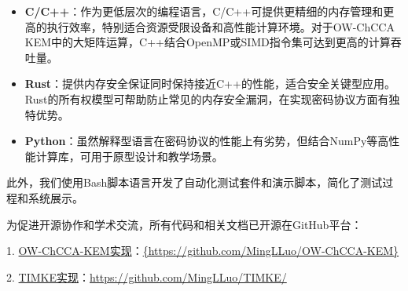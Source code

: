 \begin{itemize}
  \item \textbf{C/C++}：作为更低层次的编程语言，C/C++可提供更精细的内存管理和更高的执行效率，特别适合资源受限设备和高性能计算环境。对于OW-ChCCA KEM中的大矩阵运算，C++结合OpenMP或SIMD指令集可达到更高的计算吞吐量。
  
  \item \textbf{Rust}：提供内存安全保证同时保持接近C++的性能，适合安全关键型应用。Rust的所有权模型可帮助防止常见的内存安全漏洞，在实现密码协议方面有独特优势。
  
  \item \textbf{Python}：虽然解释型语言在密码协议的性能上有劣势，但结合NumPy等高性能计算库，可用于原型设计和教学场景。
\end{itemize}

此外，我们使用Bash脚本语言开发了自动化测试套件和演示脚本，简化了测试过程和系统展示。

为促进开源协作和学术交流，所有代码和相关文档已开源在GitHub平台：

1. \href{https://github.com/MingLLuo/OW-ChCCA-KEM}{OW-ChCCA-KEM实现}：\url{{https://github.com/MingLLuo/OW-ChCCA-KEM}}

2. \href{https://github.com/MingLLuo/TIMKE/}{TIMKE实现}：\url{https://github.com/MingLLuo/TIMKE/}